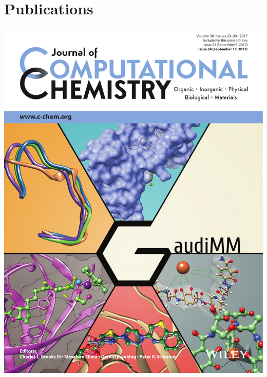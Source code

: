 

\chapter*{Publications}

\clearpage
\includegraphics[width=\textwidth]{figures/pubs/gaudimm-cover.pdf}
\clearpage
